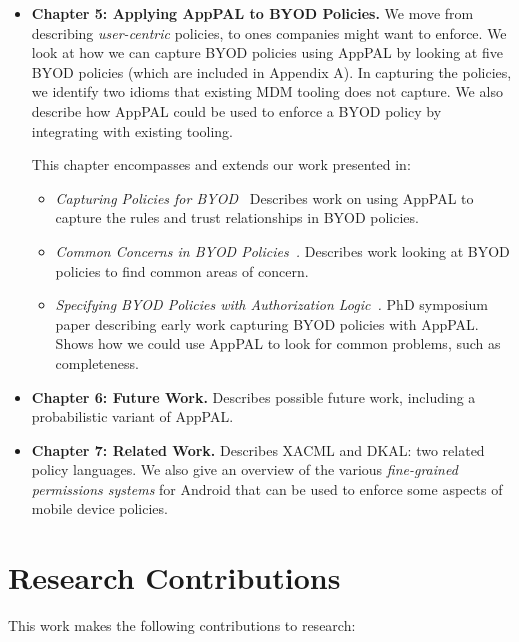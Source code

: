 \documentclass[thesis.tex]{subfiles}
\begin{document}
\begin{itemize}
\item \textbf{Chapter 5: Applying AppPAL to \ac{BYOD} Policies.}
  We move from describing \emph{user-centric} policies, to ones companies might
  want to enforce. We look at how we can capture \ac{BYOD} policies using AppPAL by
  looking at five \ac{BYOD} policies (which are included in Appendix A). In capturing the
  policies, we identify two idioms that existing MDM tooling does not capture. We
  also describe how AppPAL could be used to enforce a \ac{BYOD} policy by integrating
  with existing tooling.
  
  This chapter encompasses and extends our work presented in:
  \begin{itemize}
  \item\emph{Capturing Policies for \ac{BYOD}~\cite{hallett_capturing_2017}} Describes work on using AppPAL to capture the rules and trust relationships in \ac{BYOD} policies.
  \item\emph{Common Concerns in \ac{BYOD} Policies~\cite{hallett_common_2017}.} Describes work looking at \ac{BYOD} policies to find common areas of concern.  
  \item\emph{Specifying \ac{BYOD} Policies with Authorization Logic~\cite{hallett_specifying_2016}.} PhD symposium paper describing early work capturing \ac{BYOD} policies with AppPAL.  Shows how we could use AppPAL to look for common problems, such as completeness.
  \end{itemize}

\item \textbf{Chapter 6: Future Work.}
  Describes possible future work, including a probabilistic variant of AppPAL.
 
\item \textbf{Chapter 7: Related Work.} 
  Describes XACML and DKAL: two related policy languages. We also give an overview
  of the various \emph{fine-grained permissions systems} for Android that can be
  used to enforce some aspects of mobile device policies.
\end{itemize}

\section{Research Contributions}

This work makes the following contributions to research:
\end{document}
